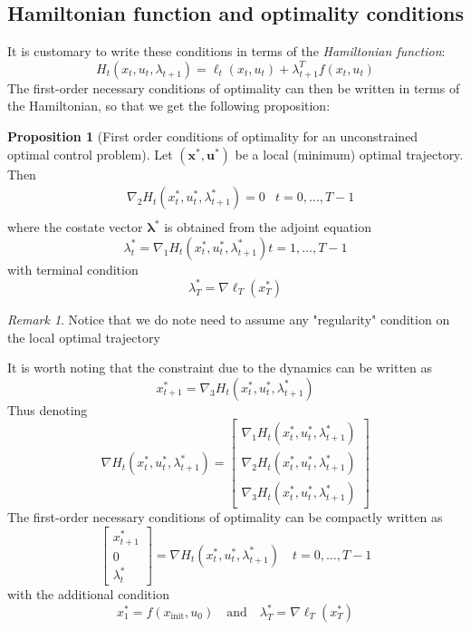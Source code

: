 \documentclass[openany]{book}
\theoremstyle{definition}
\newtheorem{proposition}{Proposition}[section]
\theoremstyle{remark}
\newtheorem*{remark}{Remark}
\begin{document}
\subsection{Hamiltonian function and optimality conditions}
It is customary to write these conditions in terms of the \emph{Hamiltonian function}: 
\[
    H_t(x_t,u_t,\lambda_{t+1}) = \ell_t(x_t,u_t) + \lambda_{t+1}^T f(x_t,u_t)
\]
The first-order necessary conditions of optimality can then be written in terms of the Hamiltonian, so that we get the following proposition:
\begin{proposition}[First order conditions of optimality for an unconstrained optimal control problem]
    Let $(\mathbf{x}^*,\mathbf{u}^*)$ be a local (minimum) optimal trajectory. Then 
    \begin{align*}
        &\nabla_2 H_t(x_t^*,u_t^*,\lambda_{t+1}^*) = 0 &t = 0,\dots,T-1\\
    \end{align*}
    where the costate vector $\boldsymbol{\lambda}^*$ is obtained from the adjoint equation 
    \[
        \lambda_t^* = \nabla_1 H_t(x_t^*,u_t^*,\lambda_{t+1}^*)  t=1,\dots,T-1
    \]
    with terminal condition
    \[
        \lambda_T^* = \nabla\ell_T(x_T^*)
    \]
\end{proposition}
\begin{remark}
    Notice that we do note need to assume any "regularity" condition on the local optimal trajectory
\end{remark}
It is worth noting that the constraint due to the dynamics can be written as 
\[
    x_{t+1}^* = \nabla_3H_t(x_t^*,u_t^*,\lambda_{t+1}^*)
\]
Thus denoting
\[
    \nabla H_t(x_t^*,u_t^*,\lambda_{t+1}^*) = \begin{bmatrix}
        \nabla_1 H_t(x_t^*,u_t^*,\lambda_{t+1}^*)\\
        \nabla_2 H_t(x_t^*,u_t^*,\lambda_{t+1}^*)\\
        \nabla_3 H_t(x_t^*,u_t^*,\lambda_{t+1}^*)
    \end{bmatrix}
\]
The first-order necessary conditions of optimality can be compactly written as 
\[
    \begin{bmatrix}
        x_{t+1}^* \\ 0 \\ \lambda_t^* 
    \end{bmatrix}  = \nabla H_t(x_t^*,u_t^*,\lambda_{t+1}^*) \quad t=0,\dots,T-1
\]
with the additional condition
\[
    x_1^* = f(x_{\text{init}},u_0) \quad \text{and} \quad \lambda_T^* = \nabla\ell_T(x_T^*)
\]
\end{document}
